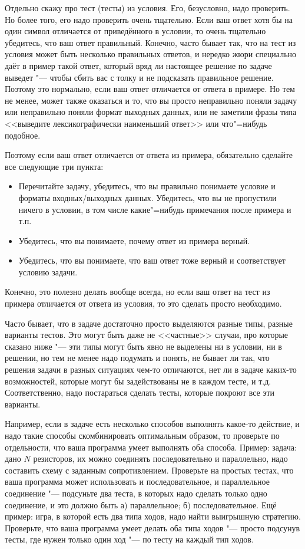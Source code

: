  Отдельно скажу про тест (тесты) из условия. Его, безусловно, надо проверить. 
Но более того, его надо проверить очень тщательно.
Если ваш ответ хотя бы на один символ отличается от приведённого в условии, то очень тщательно убедитесь, что ваш ответ правильный.
Конечно, часто бывает так, что на тест из условия может быть несколько правильных ответов, и нередко жюри специально даёт в пример такой ответ,
который вряд ли настоящее решение по задаче выведет "--- чтобы сбить вас с толку и не подсказать правильное решение.
Поэтому это нормально, если ваш ответ отличается от ответа в примере.
Но тем не менее, может также оказаться и то, что вы просто неправильно поняли задачу или неправильно поняли формат выходных данных,
или не заметили фразы типа <<выведите лексикографически наименьший ответ>> или что"=нибудь подобное.

Поэтому если ваш ответ отличается от ответа из примера, обязательно сделайте все следующие три пункта:
\begin{itemize}
\item Перечитайте задачу, убедитесь, что вы правильно понимаете условие и форматы входных/выходных данных. 
Убедитесь, что вы не пропустили ничего в условии, в том числе какие"=нибудь примечания после примера и т.п.
\item Убедитесь, что вы понимаете, почему ответ из примера верный.
\item Убедитесь, что вы понимаете, что ваш ответ тоже верный и соответствует условию задачи.
\end{itemize}
Конечно, это полезно делать вообще всегда, но если ваш ответ на тест из примера отличается от ответа из условия, то это сделать просто необходимо.

Часто бывает, что в задаче достаточно просто выделяются разные типы, разные варианты тестов. 
Это могут быть даже не <<частные>> случаи, про которые сказано ниже "--- эти типы могут быть явно не выделены
ни в условии, ни в решении, но тем не менее надо подумать и понять, не бывает ли так, что решения задачи в разных ситуациях
чем-то отличаются, нет ли в задаче каких-то возможностей, которые могут бы задействованы не в каждом тесте, и т.д.
Соответственно, надо постараться сделать тесты, которые покроют все эти варианты.

Например, если в задаче есть несколько способов выполнять какое-то действие, и надо такие способы скомбинировать оптимальным образом,
то проверьте по отдельности, что ваша программа умеет выполнять оба способа. 
Пример: задача: дано $N$ резисторов, их можно соединять последовательно и параллельно, надо составить схему с заданным сопротивлением.
Проверьте на простых тестах, что ваша программа может использовать и последовательное, и параллельное соединение "---
подсуньте два теста, в которых надо сделать только одно соединение, и это должно быть а) параллельное; б) последовательное.
Ещё пример: игра, в которой есть два типа ходов, надо найти выигрышную стратегию. Проверьте, что ваша программа умеет делать оба типа ходов
"--- просто подсунув тесты, где нужен только один ход "--- по тесту на каждый тип ходов.

